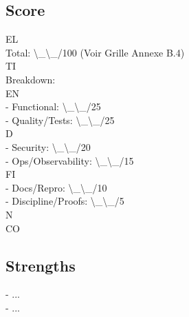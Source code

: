 \documentclass[12pt,landscape,a4paper]{article}
\begin{document}
\subsection*{Score}
\vspace{0.5em}
\vspace{0.5em}
\vspace{0.5em}
\vspace{0.5em}
EL\\
Total: \textbackslash{}_\textbackslash{}_/100 (Voir Grille Annexe B.4)\\
\vspace{0.5em}
\vspace{0.5em}
\vspace{0.5em}
\vspace{0.5em}
TI\\
Breakdown:\\
\vspace{0.5em}
\vspace{0.5em}
\vspace{0.5em}
\vspace{0.5em}
EN\\
- Functional:        \textbackslash{}_\textbackslash{}_/25\\
- Quality/Tests:     \textbackslash{}_\textbackslash{}_/25\\
\vspace{0.5em}
\vspace{0.5em}
\vspace{0.5em}
\vspace{0.5em}
D\\
- Security:          \textbackslash{}_\textbackslash{}_/20\\
- Ops/Observability: \textbackslash{}_\textbackslash{}_/15\\
\vspace{0.5em}
\vspace{0.5em}
\vspace{0.5em}
\vspace{0.5em}
FI\\
- Docs/Repro:        \textbackslash{}_\textbackslash{}_/10\\
- Discipline/Proofs: \textbackslash{}_\textbackslash{}_/5\\
N\\
CO\\
\subsection*{Strengths}
- ...\\
- ...\\
\vspace{0.5em}
\vspace{0.5em}
\end{document}
